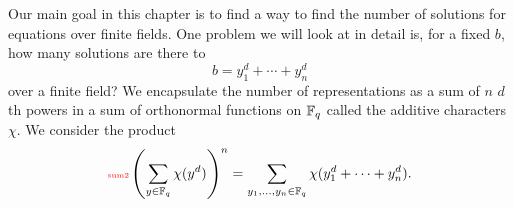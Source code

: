 %
%
Our main goal in this chapter is to find a way to find the number of solutions for equations over finite fields. One problem we will look at in detail is, for a fixed $b$, how many solutions are there to
\[
b=y_1^d+\cdots +y_n^d
\]
over a finite field? 
%
We encapsulate the number of representations as a sum of $n$ $d$th powers in  a sum of orthonormal functions on $\mathbb{F}_q$ %
called the additive characters $\chi$. %
We consider the product
\begin{equation}\llabel{sum2}
\pa{\sum_{y\in \F_q} \chi(y^d)}^n=\sum_{y_1,\ldots, y_n\in \F_q} \chi(y_1^d+\cdots + y_n^d).\end{equation}
